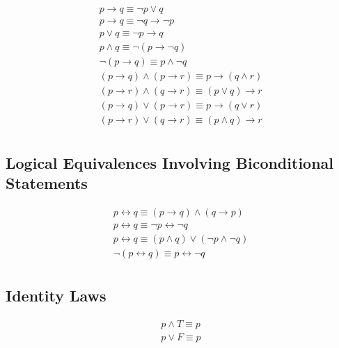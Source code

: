 \documentclass[12pt letter]{report}
\begin{document}
\begin{align*}
	p \to q \equiv \neg p \vee q                                                                  \\
	p \to q \equiv \neg q \to \neg p                                                              \\
	p \vee q \equiv \neg p \to q                                                                  \\
	p \wedge q \equiv \neg \left( p \to \neg q  \right)                                           \\
	\neg  \left( p \to q \right) \equiv p \wedge \neg q                                           \\
	\left( p \to q  \right)  \wedge \left( p \to r \right) \equiv p \to \left( q \wedge r \right) \\
	\left( p \to r \right)  \wedge \left( q \to r \right)  \equiv \left( p \vee q \right) \to r   \\
	\left( p \to q  \right) \vee \left( p \to r \right) \equiv p \to \left( q \vee r \right)      \\
	\left( p \to r \right) \vee \left( q \to r \right) \equiv \left( p \wedge q \right) \to r     \\
\end{align*}

\subsection{Logical Equivalences Involving Biconditional Statements}

\begin{align*}
	p \leftrightarrow q \equiv \left( p\to q \right) \wedge \left( q \to   p \right)              \\
	p \leftrightarrow q \equiv \neg p \leftrightarrow \neg q                                      \\
	p \leftrightarrow q \equiv \left( p \wedge q \right) \vee \left( \neg p \wedge \neg q \right) \\
	\neg \left( p \leftrightarrow q \right) \equiv p \leftrightarrow \neg q                       \\
\end{align*}

\subsection{Identity Laws}

\begin{align*}
	p \wedge T \equiv p \\
	p \vee F  \equiv p
\end{align*}
\end{document}
